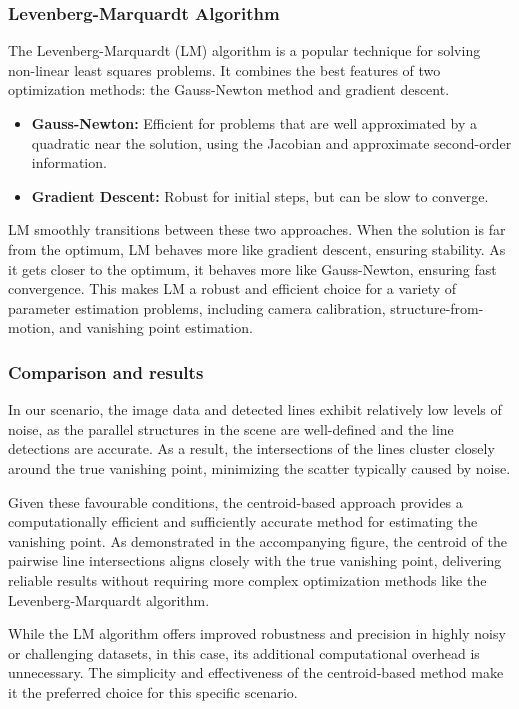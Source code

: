 \subsubsection{Levenberg-Marquardt Algorithm}
The Levenberg-Marquardt (LM) algorithm is a popular technique for solving non-linear least squares problems. It combines the best features of two optimization methods: the Gauss-Newton method and gradient descent.

\begin{itemize}
    \item \textbf{Gauss-Newton:} Efficient for problems that are well approximated by a quadratic near the solution, using the Jacobian and approximate second-order information.
    \item \textbf{Gradient Descent:} Robust for initial steps, but can be slow to converge.
\end{itemize}

LM smoothly transitions between these two approaches. When the solution is far from the optimum, LM behaves more like gradient descent, ensuring stability. As it gets closer to the optimum, it behaves more like Gauss-Newton, ensuring fast convergence. This makes LM a robust and efficient choice for a variety of parameter estimation problems, including camera calibration, structure-from-motion, and vanishing point estimation.

\subsubsection{Comparison and results}
In our scenario, the image data and detected lines exhibit relatively low levels of noise, as the parallel structures in the scene are well-defined and the line detections are accurate. As a result, the intersections of the lines cluster closely around the true vanishing point, minimizing the scatter typically caused by noise.

Given these favourable conditions, the centroid-based approach provides a computationally efficient and sufficiently accurate method for estimating the vanishing point. As demonstrated in the accompanying figure, the centroid of the pairwise line intersections aligns closely with the true vanishing point, delivering reliable results without requiring more complex optimization methods like the Levenberg-Marquardt algorithm.

While the LM algorithm offers improved robustness and precision in highly noisy or challenging datasets, in this case, its additional computational overhead is unnecessary. The simplicity and effectiveness of the centroid-based method make it the preferred choice for this specific scenario.

